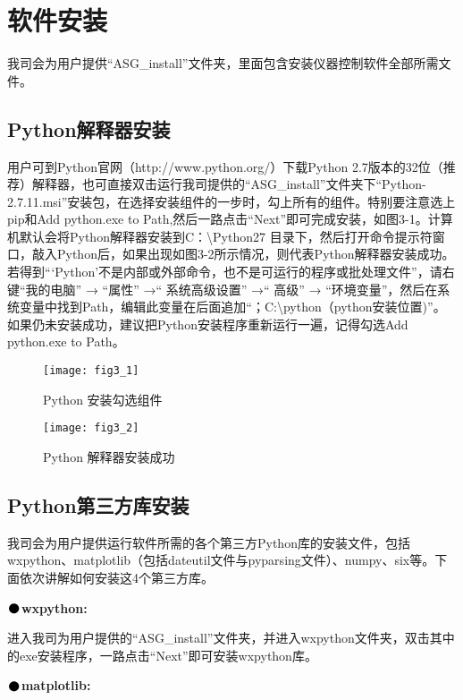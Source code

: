 \chapter{\heiti 软件安装}
\setmainfont{Times New Roman}

我司会为用户提供“ASG\_install”文件夹，里面包含安装仪器控制软件全部所需文件。

\section{Python\heiti 解释器安装}
用户可到Python官网（http://www.python.org/）下载Python 2.7版本的32位（推荐）解释器，也可直接双击运行我司提供的“ASG\_install”文件夹下“Python-2.7.11.msi”安装包，在选择安装组件的一步时，勾上所有的组件。特别要注意选上pip和Add python.exe to Path,然后一路点击“Next”即可完成安装，如图3-1。计算机默认会将Python解释器安装到C：\textbackslash Python27 目录下，然后打开命令提示符窗口，敲入Python后，如果出现如图3-2所示情况，则代表Python解释器安装成功。若得到“‘Python’不是内部或外部命令，也不是可运行的程序或批处理文件”，请右键“我的电脑” → “属性” →“ 系统高级设置” →“ 高级” → “环境变量”，然后在系统变量中找到Path，编辑此变量在后面追加“；C:\textbackslash python（python安装位置)”。如果仍未安装成功，建议把Python安装程序重新运行一遍，记得勾选Add python.exe to Path。
\begin{figure}[ht]
\centering
\texttt{[image: fig3\_1]}
\caption{Python 安装勾选组件}
\end{figure}
\begin{figure}[ht]
\centering
\texttt{[image: fig3\_2]}
\caption{Python 解释器安装成功}
\end{figure}

\section{Python\heiti 第三方库安装}
我司会为用户提供运行软件所需的各个第三方Python库的安装文件，包括wxpython、matplotlib（包括dateutil文件与pyparsing文件）、numpy、six等。下面依次讲解如何安装这4个第三方库。
\vspace{0.4cm}

\noindent$\vcenter{\hbox{\huge$\bullet$}}$\quad\fontsize{12pt}{\baselineskip}\textbf{wxpython:}

进入我司为用户提供的“ASG\_install”文件夹，并进入wxpython文件夹，双击其中的exe安装程序，一路点击“Next”即可安装wxpython库。
\vspace{0.4cm}

\noindent$\vcenter{\hbox{\huge$\bullet$}}$\quad\fontsize{12pt}{\baselineskip}\textbf{matplotlib:}

